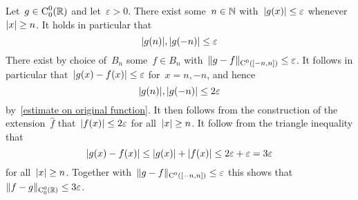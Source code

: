 Let~$g \in \operatorname{C}_0^0(\mathbb{R})$ and let~$\varepsilon > 0$.
There exist some~$n \in \mathbb{N}$ with~$\lvert g(x)\rvert \leq \varepsilon$ whenever~$\lvert x\rvert \geq n$.
It holds in particular that
\begin{equation}
  \label{estimate on original function}
        \lvert g(n)\rvert, \lvert g(-n)\rvert
  \leq  \varepsilon
\end{equation}
There exist by choice of~$B_n$ some~$f \in B_n$ with~$\lVert g-f\rVert_{\operatorname{C}^0([-n,n])} \leq \varepsilon$.
It follows in particular that~$\lvert g(x) - f(x)\rvert \leq \varepsilon$ for~$x = n, -n$, and hence
\[
        \lvert g(n)\rvert, \lvert g(-n)\rvert
  \leq  2 \varepsilon
\]
by~\eqref{estimate on original function}.
It then follows from the construction of the extension~$\hat{f}$ that~$\lvert f(x)\rvert \leq 2\varepsilon$ for all~$\lvert x\rvert \geq n$.
It follow from the triangle inequality that
\[
        \lvert g(x) - f(x)\rvert
  \leq  \lvert g(x)\rvert + \lvert f(x)\rvert
  \leq  2 \varepsilon + \varepsilon
  =     3 \varepsilon
\]
for all~$\lvert x\rvert \geq n$.
Together with~$\lVert g-f\rVert_{\operatorname{C}^0([-n,n])} \leq \varepsilon$ this shows that~$\lVert f-g\rVert_{\operatorname{C}^0_0(\mathbb{R})} \leq 3 \varepsilon$.




